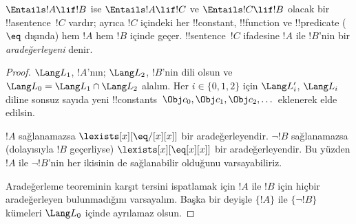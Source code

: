 \documentclass[../../../include/open-logic-section]{subfiles}
\begin{document}


\begin{thm}
$\Entails !A\lif !B$ ise $\Entails !A\lif !C$ ve
$\Entails !C\lif !B$ olacak bir !!a{sentence}~$!C$ vardır; ayrıca
$!C$ içindeki her !!{constant}, !!{function} ve !!{predicate}
($\eq$ dışında) hem $!A$ hem $!B$ içinde geçer. !!{sentence}~$!C$
ifadesine $!A$ ile $!B$'nin bir \emph{aradeğerleyeni} denir.
\end{thm}

\begin{proof}
$\Lang L_1$, $!A$'nın; $\Lang L_2$, $!B$'nin dili olsun ve
$\Lang L_0=\Lang L_1\cap\Lang L_2$ alalım. Her
$i\in\{0,1,2\}$ için $\Lang L'_i$, $\Lang L_i$ diline sonsuz sayıda
yeni !!{constant}s~$\Obj c_0,\Obj c_1,\Obj c_2,\dots$ eklenerek elde
edilsin.

$!A$ sağlanamazsa $\lexists[x][\eq/[x][x]]$ bir aradeğerleyendir.
$\lnot !B$ sağlanamazsa (dolayısıyla $!B$ geçerliyse)
$\lexists[x][\eq[x][x]]$ bir aradeğerleyendir. Bu yüzden $!A$ ile
$\lnot !B$'nin her ikisinin de sağlanabilir olduğunu varsayabiliriz.

Aradeğerleme teoreminin karşıt tersini ispatlamak için $!A$ ile $!B$
için hiçbir aradeğerleyen bulunmadığını varsayalım. Başka bir deyişle
$\{!A\}$ ile $\{\lnot !B\}$ kümeleri $\Lang L_0$ içinde ayrılamaz
olsun.


\end{proof}
\end{document}
